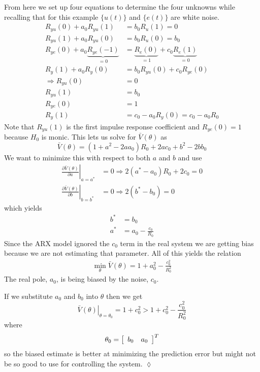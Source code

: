 \begin{example}
From here we set up four equations to determine the four unknowns while recalling that for this example $\{u(t)\}$ and $\{e(t)\}$ are white noise.
\begin{align*}
R_{yu}(0) + a_0R_{yu}(1) &= b_0R_u(1) = 0 \\
R_{yu}(1) + a_0R_{yu}(0) &= b_0R_u(0) = b_0 \\
R_{ye}(0) + a_0\underbrace{R_{ye}(-1)}_{=0} &= \underbrace{R_e(0)}_{=1} + c_0\underbrace{R_e(1)}_{=0} \\
R_y(1) + a_0R_y(0) &= b_0R_{yu}(0) + c_0R_{ye}(0) \\
\Rightarrow R_{yu}(0) &= 0 \\
R_{yu}(1) &= b_0 \\
R_{ye}(0) &= 1 \\
R_y(1) &= c_0-a_0R_y(0) = c_0-a_0R_0
\end{align*}
Note that $R_{yu}(1)$ is the first impulse response coefficient and $R_{ye}(0)=1$ because $H_0$ is monic.
This lets us solve for $\bar{V}(\theta)$ as
$$\bar{V}(\theta) = (1+a^2-2aa_0)R_0+2ac_0 + b^2 - 2bb_0$$
We want to minimize this with respect to both $a$ and $b$ and use
\begin{align*}
\left.\frac{\partial\bar{V}(\theta)}{\partial a}\right|_{a=a^\ast} &= 0 \Rightarrow 2(a^\ast-a_0)R_0+2c_0=0 \\
\left.\frac{\partial\bar{V}(\theta)}{\partial b}\right|_{b=b^\ast} &= 0 \Rightarrow 2(b^\ast-b_0)=0
\end{align*}
which yields
\begin{align*}
b^\ast &= b_0 \\
a^\ast &= a_0-\frac{c_0}{R_0}
\end{align*}
Since the ARX model ignored the $c_0$ term in the real system we are getting bias because we are not estimating that parameter.
All of this yields the relation
\begin{align*}
\boxed{\min_\theta\bar{V}(\theta) = 1+a_0^2-\frac{c_0^2}{R_0^2}}
\end{align*}
The real pole, $a_0$, is being biased by the noise, $c_0$.

If we substitute $a_0$ and $b_0$ into $\theta$ then we get
$$\left.\bar{V}(\theta)\right|_{\theta=\theta_0} = 1+c_0^2 > 1+c_0^2-\frac{c_0^2}{R_0^2}$$
where
$$\theta_0 = \left[\begin{array}{c c} b_0 & a_0 \end{array}\right]^T$$
so the biased estimate is better at minimizing the prediction error but might not be so good to use for controlling the system.
$\lozenge$
\end{example}%
